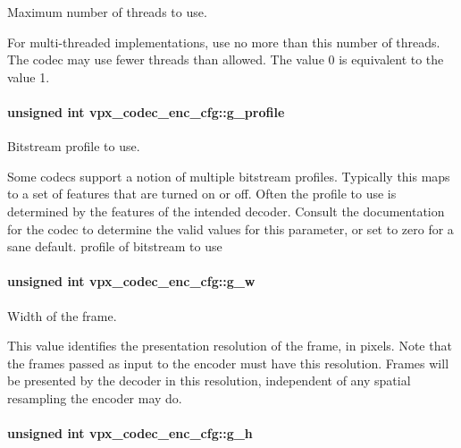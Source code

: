 \-Maximum number of threads to use. 

\-For multi-\/threaded implementations, use no more than this number of threads. \-The codec may use fewer threads than allowed. \-The value 0 is equivalent to the value 1. \hypertarget{structvpx__codec__enc__cfg_a3d7fe3a8b237338c094d5a956a41804d}{
\paragraph[{g\-\_\-profile}]{\setlength{\rightskip}{0pt plus 5cm}unsigned int {\bf vpx\-\_\-codec\-\_\-enc\-\_\-cfg\-::g\-\_\-profile}}}
\label{structvpx__codec__enc__cfg_a3d7fe3a8b237338c094d5a956a41804d}


\-Bitstream profile to use. 

\-Some codecs support a notion of multiple bitstream profiles. \-Typically this maps to a set of features that are turned on or off. \-Often the profile to use is determined by the features of the intended decoder. \-Consult the documentation for the codec to determine the valid values for this parameter, or set to zero for a sane default. profile of bitstream to use \hypertarget{structvpx__codec__enc__cfg_a5c165f5b41ca1158f2883983a2b7709c}{
\paragraph[{g\-\_\-w}]{\setlength{\rightskip}{0pt plus 5cm}unsigned int {\bf vpx\-\_\-codec\-\_\-enc\-\_\-cfg\-::g\-\_\-w}}}
\label{structvpx__codec__enc__cfg_a5c165f5b41ca1158f2883983a2b7709c}


\-Width of the frame. 

\-This value identifies the presentation resolution of the frame, in pixels. \-Note that the frames passed as input to the encoder must have this resolution. \-Frames will be presented by the decoder in this resolution, independent of any spatial resampling the encoder may do. \hypertarget{structvpx__codec__enc__cfg_a4132bd89ce85bce7c08f2cc3b6f2b82e}{
\paragraph[{g\-\_\-h}]{\setlength{\rightskip}{0pt plus 5cm}unsigned int {\bf vpx\-\_\-codec\-\_\-enc\-\_\-cfg\-::g\-\_\-h}}}
\label{structvpx__codec__enc__cfg_a4132bd89ce85bce7c08f2cc3b6f2b82e}



